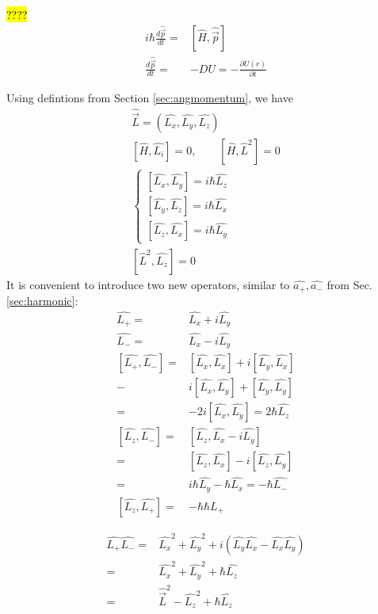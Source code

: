 		\hl{????}
		\begin{align}
			i\hbar\frac{d\hat{\vec{p}}}{dt} =& \left[\hat{H}, \hat{\vec{p}}\right] \\
			\frac{d\hat{\vec{p}}}{dt} =& -DU = -\frac{\partial U(r)}{\partial t}
		\end{align}
		
		Using defintions from Section \ref{sec:angmomentum}, we have
		\begin{align}
			\hat{\vec{L}} = \left(\hat{L_x}, \hat{L_y}, \hat{L_z}\right) \\
			\left[\hat{H}, \hat{L_i}\right] = 0, \qquad \left[\hat{H}, \hat{L}^2\right] = 0 \\
			\left\{ \begin{aligned}
				\left[\hat{L_x}, \hat{L_y}\right] = i\hbar\hat{L_z} \\
				\left[\hat{L_y}, \hat{L_z}\right] = i\hbar\hat{L_x} \\
				\left[\hat{L_z}, \hat{L_x}\right] = i\hbar\hat{L_y}
			\end{aligned} \right. \\			
			\left[\hat{L}^2, \hat{L_z}\right] = 0
		\end{align}
		It is convenient to introduce two new operators, similar to $\hat{a_+}, \hat{a_-}$ from Sec.\ref{sec:harmonic}:
		\begin{align}
			\hat{L_+} =& \hat{L_x} + i\hat{L_y} \\
			\hat{L_-} =& \hat{L_x} - i\hat{L_y}	\\
			\left[\hat{L_+}, \hat{L_-}\right] =& \left[\hat{L_x}, \hat{L_x}\right] + i\left[\hat{L_y}, \hat{L_x}\right] \\
			-& i\left[\hat{L_x}, \hat{L_y}\right] + \left[\hat{L_y}, \hat{L_y}\right] \\
			=& -2i\left[\hat{L_x}, \hat{L_y}\right] = 2\hbar\hat{L_z} \\
			\left[\hat{L_z}, \hat{L_-}\right] =& \left[\hat{L_z}, \hat{L_x} -i\hat{L_y}\right]\\
			=& \left[\hat{L_z}, \hat{L_x}\right] - i\left[\hat{L_z}, \hat{L_y}\right]\\
			=& i\hbar\hat{L_y} -\hbar\hat{L_x} = -\hbar\hat{L_-} \\
			\left[\hat{L_z}, \hat{L_+}\right] =& -\hbar\hbar{L_+}
		\end{align}
		
		\begin{align}
			\hat{L_+}\hat{L_-} =& \hat{L_x}^2 + \hat{L_y}^2 + i\left(\hat{L_y}\hat{L_x} - \hat{L_x}\hat{L_y}\right) \\
			=& \hat{L_x}^2 + \hat{L_y}^2 + \hbar\hat{L_z} \\
			=& \hat{\vec{L}}^2 - \hat{L_z}^2 + \hbar\hat{L_z}
		\end{align}
		

